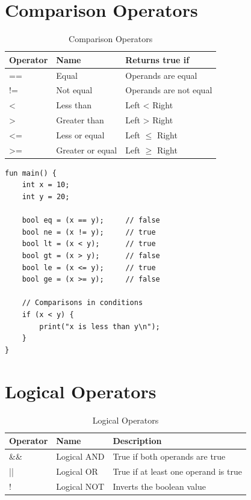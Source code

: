 \documentclass[12pt,a4paper,oneside]{book}
\begin{document}
\section{Comparison Operators}

\begin{table}[H]
\centering
\caption{Comparison Operators}
\begin{tabularx}{\textwidth}{|l|l|X|}
\hline
\textbf{Operator} & \textbf{Name} & \textbf{Returns true if} \\
\hline
== & Equal & Operands are equal \\
!= & Not equal & Operands are not equal \\
< & Less than & Left < Right \\
> & Greater than & Left > Right \\
<= & Less or equal & Left $\leq$ Right \\
>= & Greater or equal & Left $\geq$ Right \\
\hline
\end{tabularx}
\end{table}

\begin{lstlisting}[style=algo, caption={Comparison Examples}]
fun main() {
    int x = 10;
    int y = 20;
    
    bool eq = (x == y);     // false
    bool ne = (x != y);     // true
    bool lt = (x < y);      // true
    bool gt = (x > y);      // false
    bool le = (x <= y);     // true
    bool ge = (x >= y);     // false
    
    // Comparisons in conditions
    if (x < y) {
        print("x is less than y\n");
    }
}
\end{lstlisting}

\section{Logical Operators}

\begin{table}[H]
\centering
\caption{Logical Operators}
\begin{tabularx}{\textwidth}{|l|l|X|}
\hline
\textbf{Operator} & \textbf{Name} & \textbf{Description} \\
\hline
\&\& & Logical AND & True if both operands are true \\
|| & Logical OR & True if at least one operand is true \\
! & Logical NOT & Inverts the boolean value \\
\hline
\end{tabularx}
\end{table}
\end{document}

